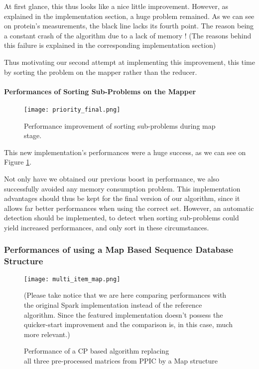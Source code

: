 \documentclass{eplmastersthesis}
\begin{document}
At first glance, this thus looks like a nice little improvement. However, as explained in the implementation section, a huge problem remained. As we can see on protein's measurements, the black line lacks its fourth point. The reason being a constant crash of the algorithm due to a lack of memory ! (The reasons behind this failure is explained in the corresponding implementation section)\newline

Thus motivating our second attempt at implementing this improvement, this time by sorting the problem on the mapper rather than the reducer.

\paragraph{Performances of Sorting Sub-Problems on the Mapper}

\begin{figure}[h]
  \centering
  \texttt{[image: priority\_final.png]}
  \caption{Performance improvement of sorting sub-problems during map stage.}
  \label{fig:priority_scheduling_improved}
\end{figure}

This new implementation's performances were a huge success, as we can see on Figure \ref{fig:priority_scheduling_improved}. \newline

Not only have we obtained our previous boost in performance, we also successfully avoided any memory consumption problem. This implementation advantages should thus be kept for the final version of our algorithm, since it allows far better performances when using the correct set. However, an automatic detection should be implemented, to detect when sorting sub-problems could yield increased performances, and only sort in these circumstances.

\subsubsection{Performances of using a Map Based Sequence Database Structure}

\begin{figure}[h]
  \centering
  \texttt{[image: multi\_item\_map.png]}
  \caption[Map based - multi\_item algorithm]{
  		Performance of a CP based algorithm replacing \\
  		all three pre-processed matrices from PPIC by a Map structure
  	\endtabular
  }
  (Please take notice that we are here comparing performances with the original Spark implementation instead of the reference algorithm. Since the featured implementation doesn't possess the quicker-start improvement and the comparison is, in this case, much more relevant.)
  \label{fig:multi_map}
\end{figure}
\end{document}
